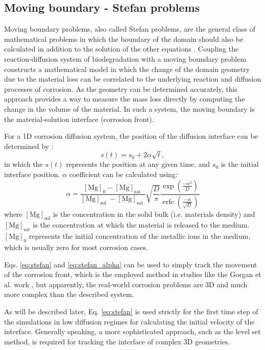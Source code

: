 \subsection{Moving boundary - Stefan problems}

Moving boundary problems, also called Stefan problems, are the general class of mathematical problems in which the boundary of the domain should also be calculated in addition to the solution of the other equations \cite{Crank1987}. Coupling the reaction-diffusion system of biodegradation with a moving boundary problem constructs a mathematical model in which the change of the domain geometry due to the material loss can be correlated to the underlying reaction and diffusion processes of corrosion. As the geometry can be determined accurately, this approach provides a way to measure the mass loss directly by computing the change in the volume of the material. In such a system, the moving boundary is the material-solution interface (corrosion front).

For a 1D corrosion diffusion system, the position of the diffusion interface can be determined by \cite{Crank1987}:
\begin{equation} \label{eq:stefan}
s(t)=s_{0}+2 \alpha \sqrt{t},
\end{equation}
in which the $s(t)$ represents the position at any given time, and $s_0$ is the initial interface position. $\alpha$ coefficient can be calculated using:
\begin{equation} \label{eq:stefan_alpha}
\alpha=\frac{[\mathrm{Mg}]_{0}-[\mathrm{Mg}]_{\text {sat }}}{[\mathrm{Mg}]_{\text {sol }}-[\mathrm{Mg}]_{\text {sat }}} \sqrt{\frac{D}{\pi}} \frac{\exp \left(\frac{-\alpha^{2}}{D}\right)}{\operatorname{erfc}\left(\frac{-\alpha}{\sqrt{D}}\right)}
\end{equation}
where $[\mathrm{Mg}]_{\text {sol}}$ is the concentration in the solid bulk (i.e. materials density) and $[\mathrm{Mg}]_{\text {sat}}$ is the concentration at which the material is released to the medium. $[\mathrm{Mg}]_{0}$ represents the initial concentration of the metallic ions in the medium, which is usually zero for most corrosion cases.

Eqs. \ref{eq:stefan} and \ref{eq:stefan_alpha} can be used to simply track the movement of the corrosion front, which is the employed method in studies like the Gorgan et al. work \cite{Grogan2014}, but apparently, the real-world corrosion problems are 3D and much more complex than the described system.

As will be described later, Eq. \ref{eq:stefan} is used strictly for the first time step of the simulations in low diffusion regimes for calculating the initial velocity of the interface. Generally speaking, a more sophisticated approach, such as the level set method, is required for tracking the interface of complex 3D geometries.

